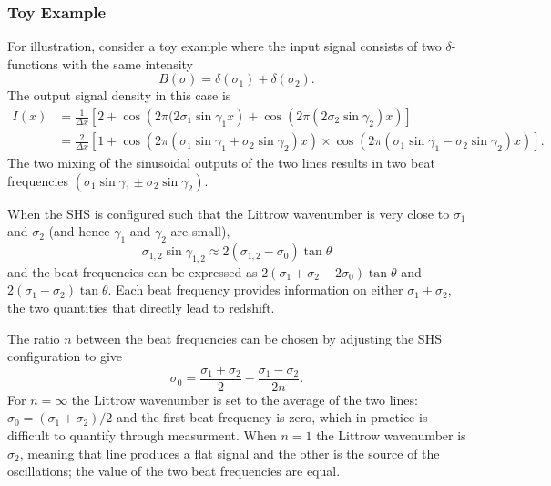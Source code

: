 \documentclass[preprint]{aastex}
\begin{document}
\subsubsection{Toy Example}
\label{toy:sec}
For illustration, consider a toy example where the input signal consists of two $\delta$-functions with the same intensity
\begin{equation}
B(\sigma)=\delta(\sigma_1)+\delta(\sigma_2).
\end{equation}
The output signal density in this case is
\begin{align}
I(x)&=\frac{1}{\Delta x}\left[2+ \cos{\left(2 \pi (2\sigma_1  \sin{\gamma_1}x \right)}+ \cos{\left(2\pi (2  \sigma_2  \sin{\gamma_2})x \right)}\right]\\
&=\frac{2}{\Delta x}\left[1+ \cos{\left(2 \pi  (\sigma_1  \sin{\gamma_1}+ \sigma_2  \sin{\gamma_2})x \right)}\times\cos{\left(2\pi  (\sigma_1  \sin{\gamma_1}- \sigma_2  \sin{\gamma_2})x\right)}\right].
\end{align}
The two mixing of the sinusoidal outputs of the two lines results in two beat frequencies $(\sigma_1  \sin{\gamma_1}\pm\sigma_2  \sin{\gamma_2})$.

When the SHS is configured such that the Littrow wavenumber is
very close to $\sigma_1$ and $\sigma_2$ (and hence $\gamma_1$ and $\gamma_2$
are small),
\begin{equation}
\sigma_{1,2}\sin{\gamma_{1,2}} \approx  2(\sigma_{1,2}-\sigma_0) \tan{\theta}
\end{equation}
and the beat frequencies can be expressed as
$2(\sigma_1+\sigma_2-2\sigma_0)\tan{\theta}$ and $2(\sigma_1-\sigma_2)\tan{\theta}$.
Each beat frequency provides information on either 
$\sigma_1\pm \sigma_2$, the two quantities that directly lead to redshift.

The ratio $n$ between the beat frequencies can be chosen by adjusting the SHS configuration to give
\begin{equation}
\sigma_0=\frac{\sigma_1+\sigma_2}{2}-\frac{\sigma_1-\sigma_2}{2n}.
\label{littrowchoices:eqn}
\end{equation}
For $n=\infty$  the Littrow wavenumber is set to the average of the two lines: $\sigma_0=(\sigma_1+\sigma_2)/2$ and the first beat frequency is zero,
which in practice is difficult to quantify through measurment.  When $n=1$ the Littrow wavenumber is $\sigma_2$, meaning that line produces a flat signal and the other is the source
of the oscillations; the value of the two beat frequencies are equal.
\end{document}
